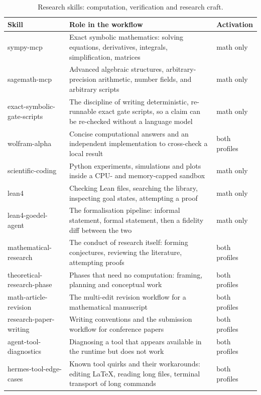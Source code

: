 \documentclass[10pt]{article}
\begin{document}
\begin{table}[htbp]
\centering\footnotesize
\caption{Research skills: computation, verification and research craft.}\label{tab:skillsresearch2}
\renewcommand{\arraystretch}{1.15}
\begin{tabularx}{\textwidth}{@{}>{\raggedright\arraybackslash}p{3.5cm} X >{\raggedright\arraybackslash}p{2.3cm}@{}}
\toprule
\textbf{Skill} & \textbf{Role in the workflow} & \textbf{Activation} \\
\midrule
sympy-mcp & Exact symbolic mathematics: solving equations, derivatives, integrals, simplification, matrices & math only \\
sagemath-mcp & Advanced algebraic structures, arbitrary-precision arithmetic, number fields, and arbitrary scripts & math only \\
exact-symbolic-gate-scripts & The discipline of writing deterministic, re-runnable exact gate scripts, so a claim can be re-checked without a language model & math only \\
wolfram-alpha & Concise computational answers and an independent implementation to cross-check a local result & both profiles \\
scientific-coding & Python experiments, simulations and plots inside a CPU- and memory-capped sandbox & math only \\
lean4 & Checking Lean files, searching the library, inspecting goal states, attempting a proof & math only \\
lean4-goedel-agent & The formalisation pipeline: informal statement, formal statement, then a fidelity diff between the two & math only \\
mathematical-research & The conduct of research itself: forming conjectures, reviewing the literature, attempting proofs & both profiles \\
theoretical-research-phase & Phases that need no computation: framing, planning and conceptual work & both profiles \\
math-article-revision & The multi-edit revision workflow for a mathematical manuscript & both profiles \\
research-paper-writing & Writing conventions and the submission workflow for conference papers & both profiles \\
agent-tool-diagnostics & Diagnosing a tool that appears available in the runtime but does not work & both profiles \\
hermes-tool-edge-cases & Known tool quirks and their workarounds: editing LaTeX, reading long files, terminal transport of long commands & both profiles \\
\bottomrule
\end{tabularx}
\end{table}
\end{document}
